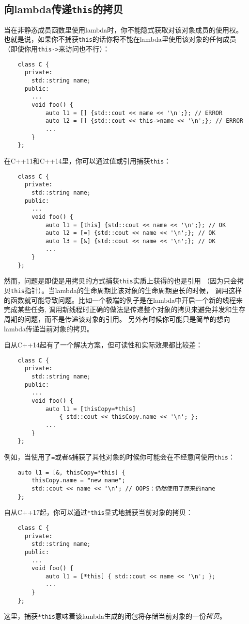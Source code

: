 \subsection{向lambda传递\texttt{this}的拷贝}
当在非静态成员函数里使用lambda时，你不能隐式获取对该对象成员的使用权。
也就是说，如果你不捕获\texttt{this}的话你将不能在lambda里使用该对象的任何成员
（即使你用\texttt{this->}来访问也不行）：
\begin{lstlisting}
    class C {
      private:
        std::string name;
      public:
        ...
        void foo() {
            auto l1 = [] {std::cout << name << '\n';}; // ERROR
            auto l2 = [] {std::cout << this->name << '\n';}; // ERROR
            ...
        }
    };
\end{lstlisting}
在C++11和C++14里，你可以通过值或引用捕获\texttt{this}：
\begin{lstlisting}
    class C {
      private:
        std::string name;
      public:
        ...
        void foo() {
            auto l1 = [this] {std::cout << name << '\n';}; // OK
            auto l2 = [=] {std::cout << name << '\n';}; // OK
            auto l3 = [&] {std::cout << name << '\n';}; // OK
            ...
        }
    };
\end{lstlisting}
然而，问题是即使是用拷贝的方式捕获\texttt{this}实质上获得的也是引用
（因为只会拷贝\texttt{this}指针）。当lambda的生命周期比该对象的生命周期更长的时候，
调用这样的函数就可能导致问题。比如一个极端的例子是在lambda中开启一个新的线程来完成某些任务,
调用新线程时正确的做法是传递整个对象的拷贝来避免并发和生存周期的问题，而不是传递该对象的引用。
另外有时候你可能只是简单的想向lambda传递当前对象的拷贝。

自从C++14起有了一个解决方案，但可读性和实际效果都比较差：
\begin{lstlisting}
    class C {
      private:
        std::string name;
      public:
        ...
        void foo() {
            auto l1 = [thisCopy=*this]
                { std::cout << thisCopy.name << '\n'; };
            ...
        }
    };
\end{lstlisting}
例如，当使用了\texttt{=}或者\texttt{\&}捕获了其他对象的时候你可能会在不经意间使用\texttt{this}：
\begin{lstlisting}
    auto l1 = [&, thisCopy=*this] {
        thisCopy.name = "new name";
        std::cout << name << '\n'; // OOPS：仍然使用了原来的name
    };
\end{lstlisting}
自从C++17起，你可以通过\texttt{*this}显式地捕获当前对象的拷贝：
\begin{lstlisting}
    class C {
      private:
        std::string name;
      public:
        ...
        void foo() {
            auto l1 = [*this] { std::cout << name << '\n'; };
            ...
        }
    };
\end{lstlisting}
这里，捕获\texttt{*this}意味着该lambda生成的闭包将存储当前对象的一份\emph{拷贝}。


